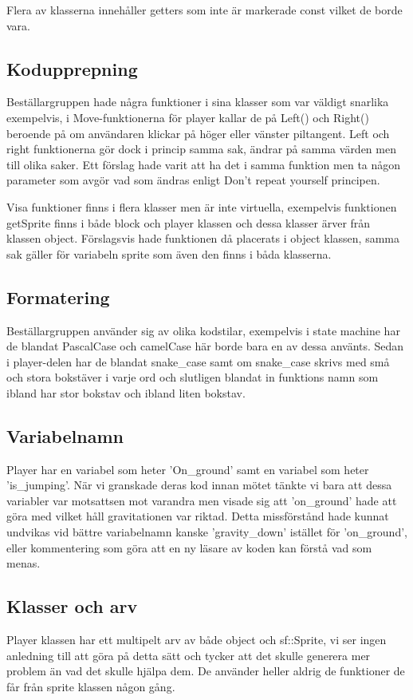 \documentclass{TDP005mall}
\begin{document}
Flera av klasserna innehåller getters som inte är markerade const vilket de borde vara.

\subsection{Kodupprepning}
Beställargruppen hade några funktioner i sina klasser som var väldigt snarlika exempelvis, i Move-funktionerna för player kallar de på Left() och Right() beroende på om användaren klickar på höger eller vänster piltangent. Left och right funktionerna gör dock i princip samma sak, ändrar på samma värden men till olika saker. Ett förslag hade varit att ha det i samma funktion men ta någon parameter som avgör vad som ändras enligt Don't repeat yourself principen.

Visa funktioner finns i flera klasser men är inte virtuella, exempelvis funktionen getSprite finns i både block och player klassen och dessa klasser ärver från klassen object.
Förslagsvis hade funktionen då placerats i object klassen, samma sak gäller för variabeln sprite som även den finns i båda klasserna.

\subsection{Formatering}
Beställargruppen använder sig av olika kodstilar, exempelvis i state machine har de blandat PascalCase och camelCase här borde bara en av dessa använts. 
Sedan i player-delen har de blandat snake\_case samt om snake\_case skrivs med små och stora bokstäver i varje ord och slutligen blandat in funktions namn som ibland har stor bokstav och ibland liten bokstav.

\subsection{Variabelnamn}
Player har en variabel som heter 'On\_ground' samt en variabel som heter 'is\_jumping'. När vi granskade deras kod innan mötet tänkte vi bara att dessa variabler var motsattsen mot varandra men visade sig att 'on\_ground' hade att göra med vilket håll gravitationen var riktad. Detta missförstånd hade kunnat undvikas vid bättre variabelnamn kanske 'gravity\_down' istället för 'on\_ground', eller kommentering som göra att en ny läsare av koden kan förstå vad som menas.

\subsection{Klasser och arv}
Player klassen har ett multipelt arv av både object och sf::Sprite, vi ser ingen anledning till att göra på detta sätt och tycker att det skulle generera mer problem än vad det skulle hjälpa dem. De använder heller aldrig de funktioner de får från sprite klassen någon gång.
\end{document}
